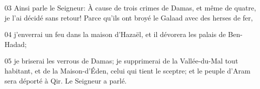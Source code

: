 
03 Ainsi parle le Seigneur: À cause de trois crimes de Damas, et même de quatre, je l’ai décidé sans retour! Parce qu’ils ont broyé le Galaad avec des herses de fer,

04 j’enverrai un feu dans la maison d’Hazaël, et il dévorera les palais de Ben-Hadad;

05 je briserai les verrous de Damas; je supprimerai de la Vallée-du-Mal tout habitant, et de la Maison-d’Éden, celui qui tient le sceptre; et le peuple d’Aram sera déporté à Qir. Le Seigneur a parlé.

